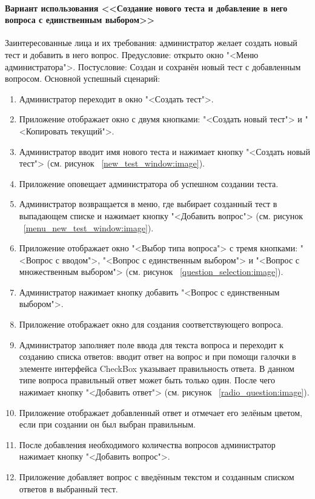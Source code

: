 \paragraph{Вариант использования <<Создание нового теста и добавление в него вопроса с единственным выбором>>}

Заинтересованные лица и их требования: администратор желает создать новый тест и добавить в него вопрос.
\newline Предусловие: открыто окно "<Меню администратора">.
\newline Постусловие: Создан и сохранён новый тест с добавленным вопросом.
\newline Основной успешный сценарий:
\begin{enumerate}
	\item Администратор переходит в окно "<Создать тест">.
	\item Приложение отображает окно с двумя кнопками: "<Создать новый тест"> и "<Копировать текущий">.
	\item Администратор вводит имя нового теста и нажимает кнопку "<Создать новый тест"> (см. рисунок ~\ref{new_test_window:image}).
	\item Приложение оповещает администратора об успешном создании теста. 
	\item Администратор возвращается в меню, где выбирает созданный тест в выпадающем списке и нажимает кнопку "<Добавить вопрос"> (см. рисунок ~\ref{menu_new_test_window:image}).
	\item Приложение отображает окно "<Выбор типа вопроса"> с тремя кнопками: "<Вопрос с вводом">, "<Вопрос с единственным выбором"> и "<Вопрос с множественным выбором"> (см. рисунок ~\ref{question_selection:image}).
	\item Администратор нажимает кнопку добавить "<Вопрос с единственным выбором">.
	\item Приложение отображает окно для создания соответствующего вопроса.
	\item Администратор заполняет поле ввода для текста вопроса и переходит к созданию списка ответов: вводит ответ на вопрос и при помощи галочки в элементе интерфейса CheckBox указывает правильность ответа. В данном типе вопроса правильный ответ может быть только один. После чего нажимает кнопку "<Добавить ответ"> (см. рисунок ~\ref{radio_question:image}).
	\item Приложение отображает добавленный ответ и отмечает его зелёным цветом, если при создании он был выбран правильным.
	\item После добавления необходимого количества вопросов администратор нажимает кнопку "<Добавить вопрос">.
	\item Приложение добавляет вопрос с введённым текстом и созданным списком ответов в выбранный тест.
\end{enumerate}

